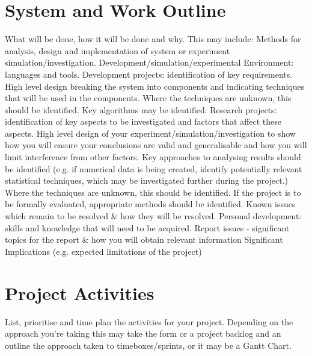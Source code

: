 \documentclass[a4paper,11pt]{techplan}
\begin{document}
\section*{System and Work Outline}
\begin{flushleft}
What will be done, how it will be done and why.
\linebreak
\linebreak
\medskip
This may include:
\linebreak
Methods for analysis, design and implementation of system or experiment simulation/investigation.
\linebreak
Development/simulation/experimental Environment: languages and tools.
\linebreak
Development projects: identification of key requirements. High level design breaking the system into components and indicating techniques that will be used in the components. Where the techniques are unknown, this should be identified.  Key algorithms may be identified.
\linebreak
Research projects: identification of key aspects to be investigated and factors that affect these aspects. High level design of your experiment/simulation/investigation to show how you will ensure your conclusions are valid and generalisable and how you will limit interference from other factors. Key approaches to analysing results should be identified (e.g. if numerical data is being created, identify potentially relevant statistical techniques, which may be investigated further during the project.) Where the techniques are unknown, this should be identified.
If the project is to be formally evaluated, appropriate methods should be identified.
\linebreak
Known issues which remain to be resolved \& how they will be resolved.
\linebreak
Personal development: skills and knowledge that will need to be acquired.
\linebreak
Report issues - significant topics for the report \& how you will obtain relevant information
\linebreak
Significant Implications (e.g. expected limitations of the project)
\end{flushleft}

\section*{Project Activities}
List, prioritise and time plan the activities for your project. Depending on the approach you’re taking this may take the form or a project backlog and an outline the approach taken to timeboxes/sprints, or it may be a Gantt Chart.
\end{document}

